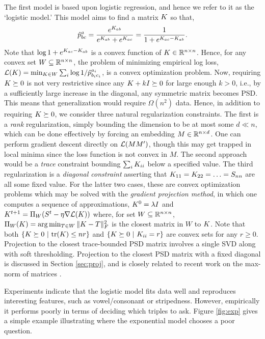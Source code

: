 \documentclass{article}
\begin{document}
The first model is based upon logistic regression, and hence we refer to it as the `logistic model.'  This model aims to find a matrix $\S$ so that,
\begin{equation}\label{eq:logistic}
\hat{p}^a_{bc} = \frac{e^{\S_{ab}}}{e^{\S_{ab}}+e^{\S_{ac}}} = \frac{1}{1+e^{\S_{ac}-\S_{ab}}}.
\end{equation}
Note that $\log 1+e^{\S_{ac}-\S_{ab}}$ is a convex function of $\S\in \reals^{n\times n}$.  Hence, for any convex set $W \subseteq \reals^{n \times n}$, the problem of minimizing empirical log loss, $\cL(\S)=\min_{\S \in W} \sum_i \log 1/\hp^{a_i}_{b_ic_i}$, is a convex optimization problem.  Now, requiring $\S \succeq 0$ is not very restrictive since any $\S+kI \succeq 0$ for large enough $k>0$, i.e., by a sufficiently large increase in the diagonal, any symmetric matrix becomes PSD. This means that generalization would require $\Omega(n^2)$ data.  Hence, in addition to requiring $\S \succeq 0$, we consider three natural regularization constraints.  The first is a {\em rank} regularization, simply bounding the dimension to be at most some $d\ll n$, which can be done effectively by forcing an embedding $M \in \reals^{n \times d}$.  One can perform gradient descent directly on $\cL(MM')$, though this may get trapped in local minima since the loss function is not convex in $M$.  The second approach would be a {\em trace} constraint bounding $\sum_i \S_{ii}$ below a specified value. The third regularization is a {\em diagonal constraint} asserting that $\S_{11}=\S_{22}=\ldots=S_{nn}$ are all some fixed value.  For the latter two cases, these are convex optimization problems which may be solved with the {\em gradient projection method}, in which one computes a sequence of approximations, $\S^0=\lambda I$ and $\S^{t+1}= \Pi_W(S^t - \eta \nabla \cL(\S))$ where, for set $W \subseteq \reals^{n \times n}$, $\Pi_W(\S)=\arg\min_{T \in W} \|\S-T\|_F^2$ is the closest matrix in $W$ to $\S$.  Note that both $\{\S \succeq 0~|~\tr(\S)\leq nr\}$ and $\{\S \succeq 0~|~\S_{ii}=r\}$ are convex sets for any $r\geq 0$.  Projection to the closest trace-bounded PSD matrix involves a single SVD along with soft thresholding.  Projection to the closest PSD matrix with a fixed diagonal is discussed in Section \ref{sec:proj}, and is closely related to recent work on the max-norm of matrices \cite{SS05,??}.

Experiments indicate that the logistic model fits data well and reproduces interesting features, such as vowel/consonant or stripedness.  However, empirically it performs poorly in terms of deciding which triples to ask.  Figure \ref{fig:exp} gives a simple example illustrating where the exponential model chooses a poor question.
\end{document}
